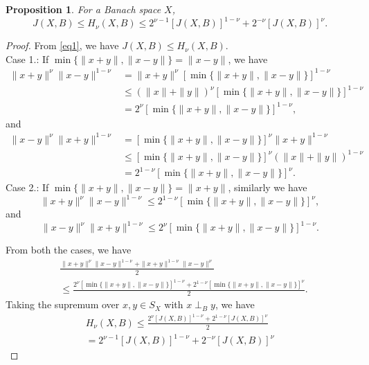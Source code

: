 \documentclass[preprint,12pt]{elsarticle}
\newtheorem{proposition}[thm]{Proposition}
\numberwithin{equation}{section}
\begin{document}
\begin{proposition}\label{pq1}
 For a Banach space $X$, \[J(X,B) \leq H_{\nu}(X,B)\leq {2^{\nu-1}[J(X,B)]^{1-\nu}+2^{-\nu}[J(X,B)]^{\nu}}.\]   
\end{proposition}
\begin{proof}
From \eqref{eq1}, we have 
$J(X,B) \leq H_{\nu}(X,B)$.\\
Case 1.: If $
\min\{\|x+y\|,\|x-y\|\}=\|x-y\|$, we have 
\begin{align*}
\|x+y\|^\nu\|x-y\|^{1-\nu}&=\|x+y\|^\nu[\min\{\|x+y\|,\|x-y\|\}]^{1-\nu}\\
&\leq (\|x\|+\|y\|)^\nu[\min\{\|x+y\|,\|x-y\|\}]^{1-\nu}\\
&=2^\nu[\min\{\|x+y\|,\|x-y\|\}]^{1-\nu},
\end{align*}
and
\begin{align*}
\|x-y\|^\nu\|x+y\|^{1-\nu}&=[\min\{\|x+y\|,\|x-y\|\}]^{\nu}\|x+y\|^{1-\nu}\\
&\leq [\min\{\|x+y\|,\|x-y\|\}]^{\nu}(\|x\|+\|y\|)^{1-\nu}\\
&=2^{1-\nu}[\min\{\|x+y\|,\|x-y\|\}]^{\nu}.
\end{align*}
Case 2.: If $
\min\{\|x+y\|,\|x-y\|\}=\|x+y\|$, similarly we have
\[\|x+y\|^\nu\|x-y\|^{1-\nu}\leq 2^{1-\nu}[\min\{\|x+y\|,\|x-y\|\}]^{\nu},\] and
\[\|x-y\|^\nu\|x+y\|^{1-\nu}\leq 2^{\nu}[\min\{\|x+y\|,\|x-y\|\}]^{1-\nu}.\]

From both the cases, we have
\begin{align*}
&\frac{\|x+y\|^{\nu}\|x-y\|^{1-\nu} + \|x+y\|^{1-\nu}\|x-y\|^{\nu}}{2}\\
& \leq \frac{2^\nu[\min\{\|x+y\|,\|x-y\|\}]^{1-\nu}+2^{1-\nu}[\min\{\|x+y\|,\|x-y\|\}]^{\nu}}{2}.
\end{align*}
Taking the supremum over $x,y \in S_X$ with $x\perp_B y$, we have
\begin{align*}
H_{\nu}(X,B)\leq\frac{2^\nu[J(X,B)]^{1-\nu}+2^{1-\nu}[J(X,B)]^{\nu}}{2}\\ 
={2^{\nu-1}[J(X,B)]^{1-\nu}+2^{-\nu}[J(X,B)]^{\nu}}
\end{align*}
\end{proof}
\end{document}

